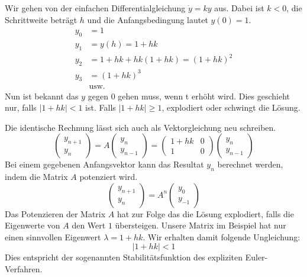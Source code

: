 Wir gehen von der einfachen Differentialgleichung $\dot{y}=ky$ aus.
Dabei ist $k < 0$, die Schrittweite beträgt $h$ und die Anfangsbedingung lautet $y(0) = 1$.
\begin{align}
	y_0 &= 1\\
	y_1 &= y(h) = 1 + hk\\
	y_2 &= 1 + hk + hk(1+hk) = (1+hk)^2\\
	y_3 &= (1+hk)^3\\
	&\text{usw.} \nonumber
\end{align} 
Nun ist bekannt das $y$ gegen $0$ gehen muss, wenn t erhöht wird.
Dies geschieht nur, falls $\vert 1+hk \vert < 1$ ist.
Falls $\vert 1+hk \vert \ge 1$, explodiert oder schwingt die Lösung.

Die identische Rechnung lässt sich auch als Vektorgleichung neu schreiben.
\begin{equation}
	\left( \begin{array}{c}y_{n+1} \\ y_n \end{array} \right) = A \left( \begin{array}{c}y_n \\ y_{n-1} \end{array} \right) = \begin{pmatrix} 
	1+hk & 0 \\
	1 & 0
	\end{pmatrix}\left( \begin{array}{c}y_n \\ y_{n-1} \end{array} \right)
\end{equation}
Bei einem gegebenen Anfangsvektor kann das Resultat $y_n$ berechnet werden, indem die Matrix $A$ potenziert wird.
\begin{equation}
\left( \begin{array}{c}y_{n+1} \\ y_n \end{array} \right) = A^n \left( \begin{array}{c}y_0 \\ y_{-1} \end{array} \right)
\end{equation}
Das Potenzieren der Matrix $A$ hat zur Folge das die Lösung explodiert, falls die Eigenwerte von $A$ den Wert $1$ übersteigen.
Unsere Matrix im Beispiel hat nur einen sinnvollen Eigenwert $\lambda = 1+hk$.
Wir erhalten damit folgende Ungleichung:
\begin{equation}
	\vert 1+hk \vert < 1
\end{equation}
Dies entspricht der sogenannten Stabilitätsfunktion des expliziten Euler-Verfahren.


